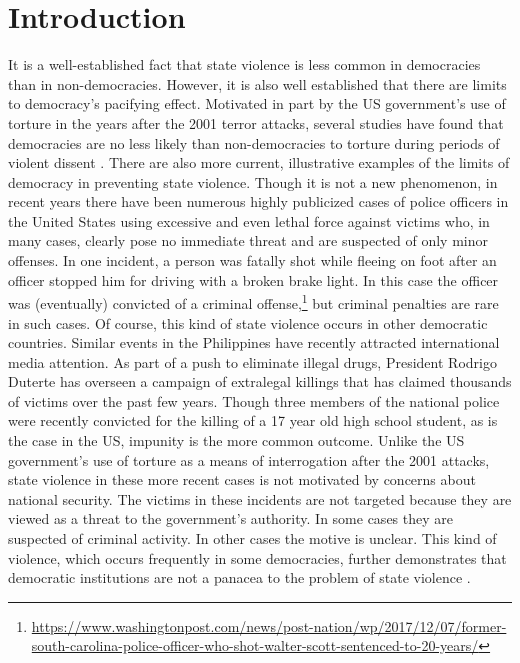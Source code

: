 \documentclass[11pt]{article}
\begin{document}
\section*{Introduction}
It is a well-established fact that state violence is less common in democracies than in non-democracies. However, it is also well established that there are limits to democracy's pacifying effect. Motivated in part by the US government's use of torture in the years after the 2001 terror attacks, several studies have found that democracies are no less likely than non-democracies to torture during periods of violent dissent \citep{Davenport2007AR,Davenport2007,DavenportMooreArmstrong2007,ConradMoore2010}. There are also more current, illustrative examples of the limits of democracy in preventing state violence. Though it is not a new phenomenon, in recent years there have been numerous highly publicized cases of police officers in the United States using excessive and even lethal force against victims who, in many cases, clearly pose no immediate threat and are suspected of only minor offenses. In one incident, a person was fatally shot while fleeing on foot after an officer stopped him for driving with a broken brake light. In this case the officer was (eventually) convicted of a criminal offense,\footnote{\url{https://www.washingtonpost.com/news/post-nation/wp/2017/12/07/former-south-carolina-police-officer-who-shot-walter-scott-sentenced-to-20-years/}} but criminal penalties are rare in such cases. Of course, this kind of state violence occurs in other democratic countries. Similar events in the Philippines have recently attracted international media attention. As part of a push to eliminate illegal drugs, President Rodrigo Duterte has overseen a campaign of extralegal killings that has claimed thousands of victims over the past few years. Though three members of the national police were recently convicted for the killing of a 17 year old high school student, as is the case in the US, impunity is the more common outcome. Unlike the US government's use of torture as a means of interrogation after the 2001 attacks, state violence in these more recent cases is not motivated by concerns about national security. The victims in these incidents are not targeted because they are viewed as a threat to the government's authority. In some cases they are suspected of criminal activity. In other cases the motive is unclear. This kind of violence, which occurs frequently in some democracies, further demonstrates that democratic institutions are not a panacea to the problem of state violence \citep{Moore2010}.  
\end{document}
